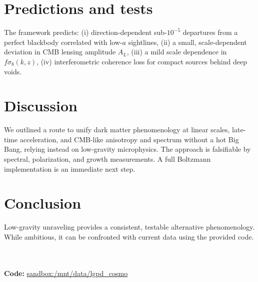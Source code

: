 \documentclass[11pt]{article}
\begin{document}
\section{Predictions and tests}
The framework predicts:
(i) direction-dependent sub-$10^{-5}$ departures from a perfect blackbody correlated with low-$a$ sightlines,
(ii) a small, scale-dependent deviation in CMB lensing amplitude $A_L$,
(iii) a mild scale dependence in $f\sigma_8(k,z)$,
(iv) interferometric coherence loss for compact sources behind deep voids.

\section{Discussion}
We outlined a route to unify dark matter phenomenology at linear scales, late-time acceleration, and CMB-like anisotropy and spectrum without a hot Big Bang, relying instead on low-gravity microphysics. The approach is falsifiable by spectral, polarization, and growth measurements. A full Boltzmann implementation is an immediate next step.

\section{Conclusion}
Low-gravity unraveling provides a consistent, testable alternative phenomenology.
While ambitious, it can be confronted with current data using the provided code.

\\

\\
\textbf{Code:} \url{sandbox:/mnt/data/lgpd_cosmo}



\end{document}
